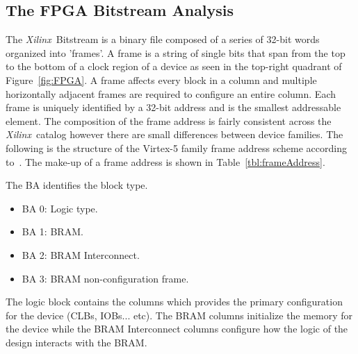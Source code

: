 \documentclass[conference]{IEEEtran}
\newcommand{\Xilinx}{\textit{\gls{Xilinx}}~}
\begin{document}
\subsection{The \acrshort{FPGA} \gls{Bitstream} Analysis} \label{sec:fpgaBitStream}
The \Xilinx \gls{Bitstream} is a binary file composed of a series of 32-bit words organized into 'frames'.
A frame is a string of single bits that span from the top to the bottom of a clock region of a device as seen in the top-right quadrant of Figure~\ref{fig:FPGA}.
A frame affects every block in a column and multiple horizontally adjacent frames are required to configure an entire column.
Each frame is uniquely identified by a 32-bit address and is the smallest addressable element.
The composition of the frame address is fairly consistent across the \Xilinx catalog however there are small differences between device families.
The following is the structure of the Virtex-5 family frame address scheme according to~\cite{virtex5ConfigGuide}.
The make-up of a frame address is shown in Table~\ref{tbl:frameAddress}.
\begin{table}[t!]
	\centering
	\caption{Frame Address}
	\label{tbl:frameAddress}
\end{table}

The \acrfull{BA} identifies the block type.
\begin{itemize}
	\item BA 0: Logic type.
	\item BA 1: \acrfull{BRAM}.
	\item BA 2: \acrshort{BRAM} Interconnect.
	\item BA 3: \acrshort{BRAM} non-configuration frame.
\end{itemize}
The logic block contains the columns which provides the primary configuration for the device (\acrshort{CLBs}, \acrshort{IOBs}... etc).
The \acrshort{BRAM} columns initialize the memory for the device while the \acrshort{BRAM} Interconnect columns configure how the logic of the design interacts with the \acrshort{BRAM}.
\end{document}
